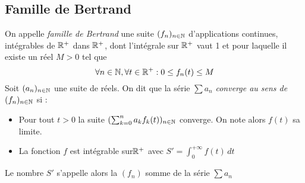 \subsection*{Famille de Bertrand}
On appelle \emph{famille de Bertrand} une suite $(f_{n})_{n\in \Bbb{N}}$ d'applications continues, intégrables de $\Bbb{R}^{+}$ dans $\Bbb{R}^{+}$, dont l'intégrale sur $\Bbb{R}^{+}$ vaut 1 et pour laquelle il existe un réel $M>0$ tel que 
$$\forall n \in \Bbb{N}, \forall t \in \Bbb{R}^{+}:0\leq f_{n}(t)\leq M$$
Soit $(a_{n})_{n\in\Bbb{N}}$ une suite de réels. On dit que la série $\sum a_{n}$ \emph{converge au sens de} $(f_{n})_{n\in \Bbb{N}}$ si :
\begin{itemize}
\item Pour tout $t>0$ la suite $(\sum _{k=0}^{n}a_{k}f_{k}(t))_{n\in \Bbb{N}}$ converge. On note alors $f(t)$ sa limite.
\item La fonction $f$ est intégrable sur$\Bbb{R}^{+}$ avec $S'=\int_{0}^{+\infty}f(t)\,dt$
\end{itemize}
Le nombre $S'$ s'appelle alors la $(f_{n})$ somme de la série $\sum a_{n}$
